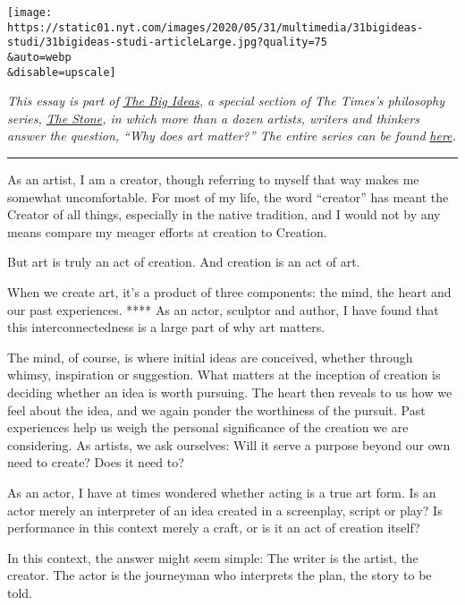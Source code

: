 \texttt{[image: https://static01.nyt.com/images/2020/05/31/multimedia/31bigideas-studi/31bigideas-studi-articleLarge.jpg?quality=75\\\&auto=webp\\\&disable=upscale]}

\emph{This essay is part of}
\href{https://www.nytimes.com/spotlight/the-big-ideas}{\emph{The Big
Ideas}}\emph{, a special section of The Times's philosophy series,}
\href{https://www.nytimes.com/column/the-stone?action=click\&module=RelatedLinks\&pgtype=Article}{\emph{The
Stone}}\emph{, in which more than a dozen artists, writers and thinkers
answer the question, ``Why does art matter?'' The entire series can be
found}
\href{https://www.nytimes.com/spotlight/the-big-ideas}{\emph{here}}\emph{.}

\begin{center}\rule{0.5\linewidth}{\linethickness}\end{center}

As an artist, I am a creator, though referring to myself that way makes
me somewhat uncomfortable. For most of my life, the word ``creator'' has
meant the Creator of all things, especially in the native tradition, and
I would not by any means compare my meager efforts at creation to
Creation.

But art is truly an act of creation. And creation is an act of art.

When we create art, it's a product of three components: the mind, the
heart and our past experiences. **** As an actor, sculptor and author, I
have found that this interconnectedness is a large part of why art
matters.

The mind, of course, is where initial ideas are conceived, whether
through whimsy, inspiration or suggestion. What matters at the inception
of creation is deciding whether an idea is worth pursuing. The heart
then reveals to us how we feel about the idea, and we again ponder the
worthiness of the pursuit. Past experiences help us weigh the personal
significance of the creation we are considering. As artists, we ask
ourselves: Will it serve a purpose beyond our own need to create? Does
it need to?

As an actor, I have at times wondered whether acting is a true art form.
Is an actor merely an interpreter of an idea created in a screenplay,
script or play? Is performance in this context merely a craft, or is it
an act of creation itself?

In this context, the answer might seem simple: The writer is the artist,
the creator. The actor is the journeyman who interprets the plan, the
story to be told.

